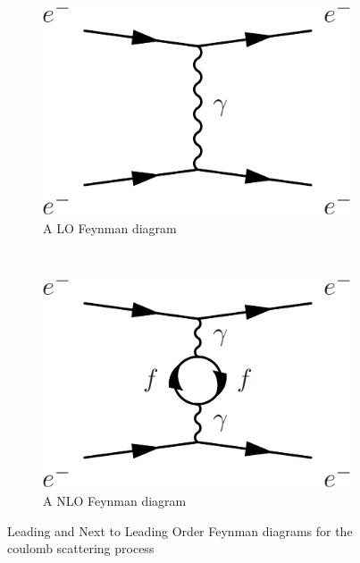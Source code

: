 \begin{figure}
    \centering
    \begin{subfigure}[h]{0.45\textwidth}
        \includegraphics[width=\textwidth]{Figures/Feynman_Diagrams/qft_ex__lo_diagram__coulomb_scattering.pdf}
        \caption{A LO Feynman diagram }\label{fig:qft_lo_ee_scattering}
      \end{subfigure}
      ~ %
      \begin{subfigure}[h]{0.45\textwidth}
          \includegraphics[width=\textwidth]{Figures/Feynman_Diagrams/qft_ex__nlo_diagram__coulomb_scattering.pdf}
          \caption{A NLO Feynman diagram}\label{fig:qft_nlo_ee_scattering}
      \end{subfigure}
      \caption{Leading and Next to Leading Order Feynman diagrams
        for the coulomb scattering process} \label{fig:feynman_diagrams_ee_scattering}
\end{figure}

